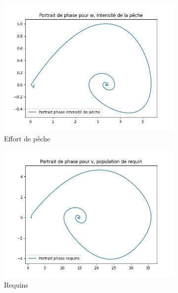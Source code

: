 \documentclass[a4paper, 11pt]{report}%
\begin{document}
        \begin{figure}[!h]
    		\begin{subfigure}[b]{.3\textwidth}
        		\centering
        		\includegraphics[width=\textwidth]{figures/Portrait_de_phase_peche.png}
            	\caption{Effort de pêche}
    		\end{subfigure}
    		\begin{subfigure}[b]{.3\textwidth}
        		\centering
       			\includegraphics[width=\textwidth]{figures/Portrait_de_phase_requins.png}
        		\caption{Requins}
    		\end{subfigure}
    		\begin{subfigure}[b]{.3\textwidth}

\end{subfigure}
\end{figure}
\end{document}
